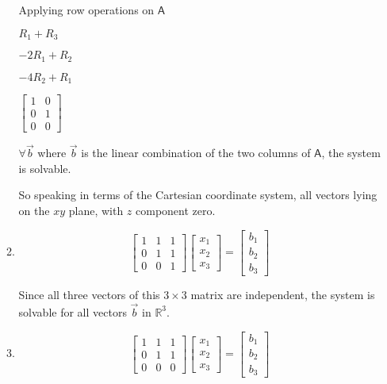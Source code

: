 \documentclass[a4paper, 11pt]{article}
\newcommand{\mat}[1]{\boldsymbol { \mathsf{#1}} }
\begin{document}
\begin{enumerate}
\begin{enumerate}
Applying row operations on $\mat A$

\begin{center}
	
$R_1 + R_3$

$-2R_1 + R_2$

$-4R_2 + R_1$

$
\begin{bmatrix}
1 & 0 \\ 
0 & 1 \\
0 & 0
\end{bmatrix}
$	
\end{center}

$\forall \vec b$ where $\vec b$ is the linear combination of the two columns of  $\mat A$, the system is solvable.

So speaking in terms of the Cartesian coordinate system, all vectors lying on the $xy$ plane, with $z$ component zero.

\item 
\[ 
\left[ \begin{array}{ccc}
1  & 1 & 1\\
0  & 1 & 1\\
0 & 0 & 1
\end{array} \right]
%
\left[ \begin{array}{c}
 x_1\\
 x_2\\
x_3
\end{array} \right]
%
= \left[ \begin{array}{c}
 b_1\\
 b_2\\
 b_3 
\end{array} \right]
\]

Since all three vectors of this $3\times3$ matrix are independent, the system is solvable for all vectors $\vec b$ in $\mathds{R}^3$.
\item
\[
 \left[ \begin{array}{ccc}
1  & 1 & 1\\
0  & 1 & 1\\
0 & 0 & 0
\end{array} \right]
%
\left[ \begin{array}{c}
 x_1\\
 x_2\\
x_3
\end{array} \right]
%
= \left[ \begin{array}{c}
 b_1\\
 b_2\\
 b_3 
\end{array} \right]
\]


\end{enumerate}
\end{enumerate}
\end{document}

